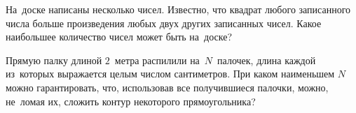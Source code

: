 \begin{problems}
\item
На~доске написаны несколько чисел.
Известно, что квадрат любого записанного числа больше произведения любых двух
других записанных чисел.
Какое наибольшее количество чисел может быть на~доске?

\item
Прямую палку длиной $2$~метра распилили на~$N$~палочек, длина каждой из~которых
выражается целым числом сантиметров.
При каком наименьшем $N$ можно гарантировать, что, использовав все получившиеся
палочки, можно, не~ломая их, сложить контур некоторого прямоугольника?

\end{problems}

